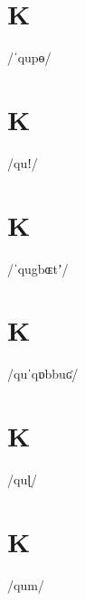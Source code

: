 \documentclass[10pt,a4paper,twoside]{book}
\begin{document}
\section*{K}

\begin{multicols}{3}
 {/ˈqupɵ/} {}
\end{multicols}

\section*{K}

\begin{multicols}{3}
 {/quǃ/} {}
\end{multicols}

\section*{K}

\begin{multicols}{3}
 {/ˈqugbɶtʼ/} {}
\end{multicols}

\section*{K}

\begin{multicols}{3}
 {/quˈqɒbbuʛ/} {}
\end{multicols}

\section*{K}

\begin{multicols}{3}
 {/quɭ/} {}
\end{multicols}

\section*{K}

\begin{multicols}{3}
 {/qum/} {}
\end{multicols}
\end{document}
